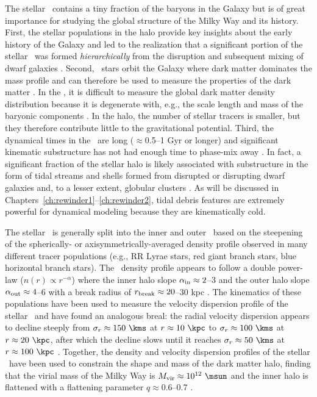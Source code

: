 The stellar \mwhalo\ contains a tiny fraction of the baryons in the Galaxy
\citep[$\approx$1\%;][]{bell08} but is of great importance for studying the
global structure of the Milky Way and its history. First, the stellar
populations in the halo provide key insights about the early history of the
Galaxy and led to the realization that a significant portion of the stellar
\mwhalo\ was formed \emph{hierarchically} from the disruption and subsequent
mixing of dwarf galaxies \citep[e.g.,][]{searle78, bullock05, bell08}. Second,
\mwhalo\ stars orbit the Galaxy where dark matter dominates the mass profile and
can therefore be used to measure the properties of the dark matter \mwhalo. In
the \mwdisk, it is difficult to measure the global dark matter density
distribution because it is degenerate with, e.g., the scale length and mass of
the baryonic components \citep{dehnen98a,sofue09}. In the halo, the number of
stellar tracers is smaller, but they therefore contribute little to the
gravitational potential. Third, the dynamical times in the \mwhalo\ are long
($\approx$0.5--1 Gyr or longer) and significant kinematic substructure has not
had enough time to phase-mix away \citep{helmi99}. In fact, a significant
fraction \citep[$\approx$40--50\%;][]{bell08} of the stellar halo is likely
associated with substructure in the form of tidal streams and shells formed from
disrupted or disrupting dwarf galaxies and, to a lesser extent, globular
clusters \citep[e.g.,][]{newberg02,majewski03,belokurov06}. As will be discussed
in  Chapters~\ref{ch:rewinder1}--\ref{ch:rewinder2},
tidal debris features are extremely powerful for dynamical modeling because they
are kinematically cold.

The stellar \mwhalo\ is generally split into the inner and outer \mwhalo\ based
on the steepening of the spherically- or axisymmetrically-averaged density
profile observed in many different tracer populations (e.g., RR Lyrae stars, red
giant branch stars, blue horizontal branch stars). The \mwhalo\ density profile
appears to follow a double power-law ($n(r) \propto r^{-\alpha}$) where the
inner halo slope $\alpha_{\rm in} \approx 2$--3 and the outer halo slope
$\alpha_{\rm out} \approx 4$--6 with a break radius of $r_{\rm break} \approx
20$--30 kpc \citep{watkins09, sesar10, deason11, sesar11, sesar13a}. The
kinematics of these populations have been used to measure the velocity
dispersion profile of the stellar \mwhalo\ and have found an analogous
breal: the radial velocity dispersion appears to decline steeply from
$\sigma_r \approx 150~\kms$ at $r\approx10~\kpc$ to $\sigma_r \approx 100~\kms$
at $r\approx20~\kpc$, after which the decline slows until it reaches $\sigma_r
\approx 50~\kms$ at $r\approx100~\kpc$ \citep{battaglia05, xue08, brown10,
deason12b, deason13}. Together, the density and velocity dispersion profiles of
the stellar \mwhalo\ have been used to constrain the shape and mass of the dark
matter halo, finding that the virial mass of the Milky Way is $M_{\rm vir}
\approx 10^{12}~\msun$ and the inner halo is flattened with a flattening
parameter $q \approx 0.6$--0.7 \citep{sesar11, deason11, sesar13a, xue15}.

